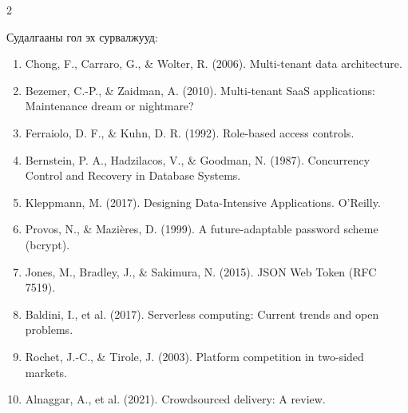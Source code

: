 \begin{multicols*}{2}

\small
Судалгааны гол эх сурвалжууд:
\begin{enumerate}
    \itemsep=0pt
    \item Chong, F., Carraro, G., \& Wolter, R. (2006). Multi-tenant data architecture.
    \item Bezemer, C.-P., \& Zaidman, A. (2010). Multi-tenant SaaS applications: Maintenance dream or nightmare?
    \item Ferraiolo, D. F., \& Kuhn, D. R. (1992). Role-based access controls.
    \item Bernstein, P. A., Hadzilacos, V., \& Goodman, N. (1987). Concurrency Control and Recovery in Database Systems.
    \item Kleppmann, M. (2017). Designing Data-Intensive Applications. O'Reilly.
    \item Provos, N., \& Mazi\`eres, D. (1999). A future-adaptable password scheme (bcrypt).
    \item Jones, M., Bradley, J., \& Sakimura, N. (2015). JSON Web Token (RFC 7519).
    \item Baldini, I., et al. (2017). Serverless computing: Current trends and open problems.
    \item Rochet, J.-C., \& Tirole, J. (2003). Platform competition in two-sided markets.
    \item Alnaggar, A., et al. (2021). Crowdsourced delivery: A review.
\end{enumerate}
\normalsize

\end{multicols*}
